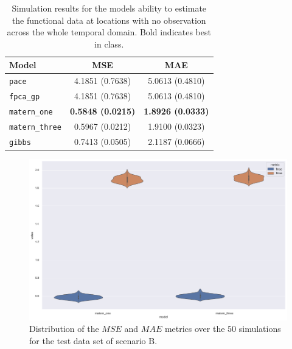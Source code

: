 \begin{table}
	\caption[Simulation results for Scenario B on test data]{Simulation results for the models ability to estimate the functional data at locations with no observation across the whole temporal domain. Bold indicates best in class.}
	\centering
	\label{tab:test_B}
	\begin{tabular}{lcc}
		\toprule
		\textbf{Model} & \textbf{MSE} & \textbf{MAE} \\
		\midrule
		\verb*|pace| & 4.1851 (0.7638) & 5.0613	(0.4810) \\
		\verb*|fpca_gp| & 4.1851 (0.7638) & 5.0613 (0.4810) \\
		\verb*|matern_one| & \textbf{0.5848	(0.0215)} & \textbf{1.8926	(0.0333)} \\
		\verb*|matern_three| & 0.5967 (0.0212) & 1.9100	(0.0323) \\
		\verb*|gibbs| & 0.7413 (0.0505) & 2.1187 (0.0666)\\
		\bottomrule
	\end{tabular}
\end{table}

\begin{figure}
	\centering
	\includegraphics[width=\textwidth]{comp_test_B}
	\caption{Distribution of the $MSE$ and $MAE$ metrics over the $50$ simulations for the test data set of scenario B.}
	\label{fig:test_comp_B}
\end{figure}

